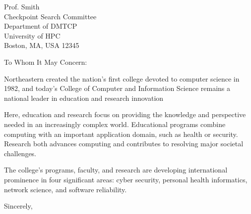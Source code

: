 \documentclass[11pt,letterpaper]{letter}
\begin{document}
\begin{letter}{Prof. Smith\\ Checkpoint Search Committee\\
Department of DMTCP\\ University of HPC\\ Boston, MA, USA 12345\\ }

\opening{To Whom It May Concern:}

Northeastern created the nation's first college devoted to computer science in
1982, and today's College of Computer and Information Science remains a
national leader in education and research innovation

Here, education and research focus on providing the knowledge and perspective
needed in an increasingly complex world. Educational programs combine computing
with an important application domain, such as health or security. Research both
advances computing and contributes to resolving major societal challenges.

The college's programs, faculty, and research are developing international
prominence in four significant areas: cyber security, personal health
informatics, network science, and software reliability.

\closing{Sincerely,}

\end{letter}
\end{document}
